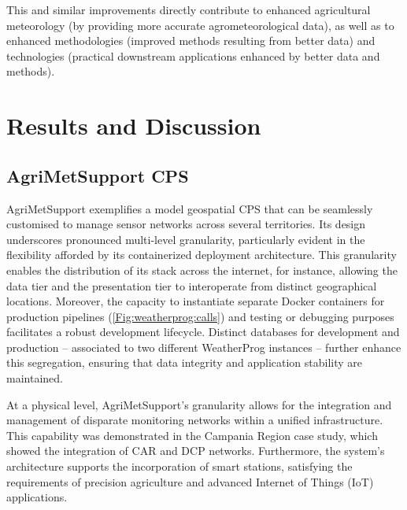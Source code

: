 \documentclass[authoryear,preprint,review,12pt]{elsarticle}
\begin{document}
This and similar improvements directly contribute to enhanced agricultural meteorology (by providing more accurate agrometeorological data), as well as to enhanced methodologies (improved methods resulting from better data) and technologies (practical downstream applications enhanced by better data and methods).
\section{Results and Discussion} \label{Results-Discussion}

\subsection{AgriMetSupport CPS}
AgriMetSupport exemplifies a model geospatial CPS that can be seamlessly customised to manage sensor networks across several territories.
Its design underscores pronounced multi-level granularity,
particularly evident in the flexibility afforded by its containerized deployment architecture. 
This granularity enables the distribution of its stack across the internet, for instance, allowing the data tier and the presentation tier to interoperate from distinct geographical locations. 
Moreover, the capacity to instantiate separate Docker containers for production pipelines (\cref{Fig:weatherprog:calls}) and testing or debugging purposes facilitates a robust development lifecycle.
Distinct databases for development and production -- associated to two different WeatherProg instances -- further enhance this segregation, ensuring that data integrity and application stability are maintained.

At a physical level, AgriMetSupport's granularity allows for the integration and management of disparate monitoring networks within a unified infrastructure.
This capability was demonstrated in the Campania Region case study, which showed the integration of CAR and DCP networks.
Furthermore, the system's architecture supports the incorporation of smart stations, satisfying the requirements of precision agriculture and advanced Internet of Things (IoT) applications. %
\end{document}
